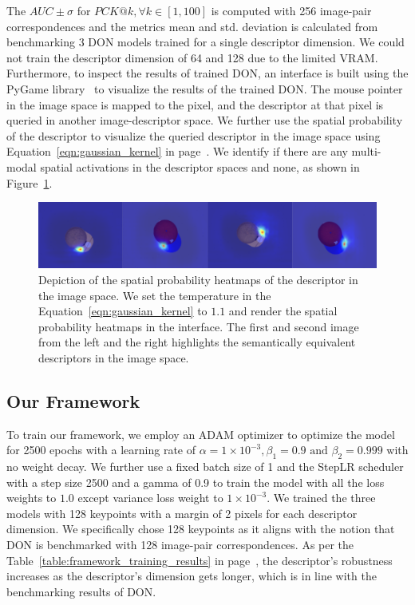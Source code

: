 The $AUC \pm \sigma$ for $PCK@k, \forall k \in [1, 100]$ is computed with 256 image-pair correspondences and
the metrics mean and std. deviation is calculated from benchmarking 3 DON models trained for a single descriptor dimension.
We could not train the descriptor dimension of 64 and 128 due to the limited VRAM. Furthermore, to inspect the
results of trained DON, an interface is built using the PyGame library~\cite{pygame} to visualize the results of the trained DON.
The mouse pointer in the image space is mapped to the pixel, and the descriptor at that pixel is queried in another image-descriptor space.
We further use the spatial probability of the descriptor to visualize the queried descriptor
in the image space using Equation~\ref{eqn:gaussian_kernel} in page~\pageref{eqn:gaussian_kernel}.
We identify if there are any multi-modal spatial activations in the descriptor spaces and none, as shown in Figure~\ref{fig:check_don}.

\begin{figure}[htb]
    \centering
    \includegraphics[scale=0.3]{images/test_don.png}
    \caption{Depiction of the spatial probability heatmaps of the descriptor in the image space. We set the temperature in the Equation~\ref{eqn:gaussian_kernel} to $1.1$
        and render the spatial probability heatmaps in the interface. The first and second image from the left and the right highlights the semantically equivalent descriptors in the image space.}
    \label{fig:check_don}
\end{figure}


\subsection{Our Framework}

To train our framework, we employ an ADAM optimizer to optimize the model for 2500 epochs with a learning rate of
$\alpha = 1 \times 10^{-3}, \beta_1 = 0.9 \text{ and } \beta_2 = 0.999$ with no weight decay.
We further use a fixed batch size of 1 and the StepLR scheduler with a step size 2500 and a gamma of 0.9 to train the model with all the loss weights to $1.0$ except variance loss weight to $1 \times 10^{-3}$.
We trained the three models with 128 keypoints with a margin of 2 pixels for each descriptor dimension. We specifically chose 128 keypoints as it aligns with the notion that DON is benchmarked with 128 image-pair correspondences.
As per the Table~\ref{table:framework_training_results} in page~\pageref{table:framework_training_results}, the descriptor's robustness increases as the descriptor's dimension gets longer, which is in line with the benchmarking results of DON.

